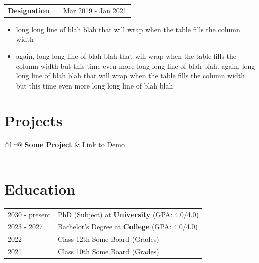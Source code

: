 \documentclass[a4paper,10pt]{article}
\makeatletter
\newenvironment{joblong}[2]
    {
    \begin{tabularx}{\linewidth}{@{}l X r@{}}
    \textbf{#1} & \hfill &  #2 \\[3.75pt]
    \end{tabularx}
    \begin{minipage}[t]{\linewidth}
    \begin{itemize}[nosep,after=\strut, leftmargin=1em, itemsep=3pt,label=--]
    }
    {
    \end{itemize}
    \end{minipage}    
    }
\makeatother
\begin{document}
\begin{joblong}{Designation}{Mar 2019 - Jan 2021}
\item long long line of blah blah that will wrap when the table fills the column width
\item again, long long line of blah blah that will wrap when the table fills the column width but this time even more long long line of blah blah. again, long long line of blah blah that will wrap when the table fills the column width but this time even more long long line of blah blah
\end{joblong}
  
\section{Projects}

\begin{tabularx}{\linewidth}{ @{}l r@{} }
\textbf{Some Project} & \hfill \href{https://some-link.com}{Link to Demo} \\[3.75pt]
  \\
\end{tabularx}

\section{Education}
\begin{tabularx}{\linewidth}{@{}l X@{}}	
2030 - present & PhD (Subject) at \textbf{University} \hfill \normalsize (GPA: 4.0/4.0) \\

2023 - 2027 & Bachelor's Degree at \textbf{College} \hfill (GPA: 4.0/4.0) \\ 

2022 & Class 12th Some Board \hfill  (Grades) \\

2021 & Class 10th Some Board \hfill  (Grades) \\
\end{tabularx}
\end{document}
